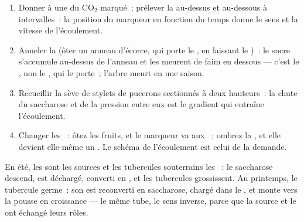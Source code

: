 \begin{method}\label{met:b1:plant-transport:translocation}
\begin{enumerate}
  \item Donner à une  du $\mathrm{CO_2}$ marqué~; prélever la
         au-dessus et au-dessous à intervalles~: la position du
        marqueur en fonction du temps donne le sens et la vitesse de
        l'écoulement.
  \item Anneler la  (ôter un anneau d'écorce, qui porte le
        , en laissant le )~: le sucre s'accumule au-dessus
        de l'anneau et les  meurent de faim en dessous --- c'est
        le , non le , qui le porte~; l'arbre meurt en une
        saison.
  \item Recueillir la sève de stylets de pucerons sectionnés à deux
        hauteurs~: la chute du saccharose et de la pression entre eux
        est le gradient qui entraîne l'écoulement.
  \item Changer les ~: ôtez les fruits, et le marqueur va aux
        ~; ombrez la , et elle devient elle-même un .
        Le schéma de l'écoulement est celui de la demande.
\end{enumerate}
\end{method}

\begin{example}\label{ex:b1:plant-transport:potato}
En été, les  sont les sources et les tubercules souterrains les
~: le saccharose descend, est déchargé, converti en , et les
tubercules grossissent. Au printemps, le tubercule germe~: son 
est reconverti en saccharose, chargé dans le , et monte vers la
pousse en croissance --- le même tube, le sens inverse, parce que la
source et le  ont échangé leurs rôles.
\end{example}

